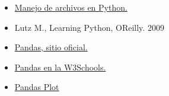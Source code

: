 \begin{itemize}
  \item \href{https://www.w3schools.com/python/python_file_handling.asp}{Manejo de archivos en Python.}
  \item Lutz M., Learning Python, O\textquotesingle Reilly. 2009 
  \item \href{https://pandas.pydata.org/}{Pandas, sitio oficial.}
  \item \href{https://www.w3schools.com/python/pandas/default.asp}{Pandas en la W3Schools.}
  \item \href{https://pandas.pydata.org/docs/reference/api/pandas.DataFrame.plot.html}{Pandas Plot}
\end{itemize}
